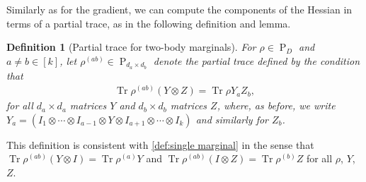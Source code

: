 \documentclass{article}
\newtheorem{definition}{Definition}
\newcommand{\ot}{\otimes}
\newcommand\PD{\operatorname{P}}
\newcommand\tr{\operatorname{Tr}}
\newcommand{\CF}[1]{{\color{purple}[CF: #1]}}
\begin{document}
Similarly as for the gradient, we can compute the components of the Hessian in terms of a partial trace, as in the following definition and lemma.

\begin{definition}[Partial trace for two-body marginals]
For $\rho \in \PD_D$ and $a \neq b\in[k]$, let $\rho^{(ab)} \in \PD_{d_a \times d_b}$ denote the \emph{partial trace} defined by the condition that
\begin{align*}
  \tr \rho^{(ab)} (Y \ot Z) = \tr \rho Y_a Z_b,
\end{align*}
for all $d_a \times d_a$ matrices $Y$ and $d_b \times d_b$ matrices $Z$, where, as before, we write~$Y_a = (I_1 \ot \cdots \ot I_{a-1} \ot Y \ot I_{a+1} \ot \cdots \ot I_k)$ and similarly for $Z_b$. %
\end{definition}

\noindent
This definition is consistent with \cref{def:single marginal} in the sense that $\tr \rho^{(ab)} (Y \ot I) = \tr \rho^{(a)} Y$ and $\tr \rho^{(ab)} (I \ot Z) = \tr \rho^{(b)} Z$ for all $\rho$, $Y$, $Z$.
\end{document}
